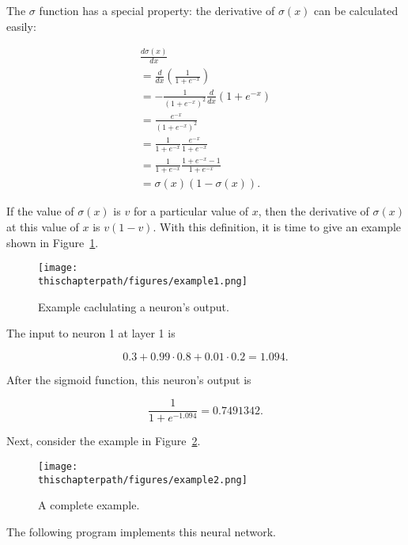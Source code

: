 The $\sigma$ function has a special property: the derivative of
$\sigma(x)$ can be calculated easily:

\begin{equation}
\begin{array}{l}
\frac{d \sigma(x)}{d x} \\
=  \frac{d}{dx} (\frac{1}{1 + e^{-x}}) \\
= - \frac{1}{(1 + e^{-x})^2} \frac{d}{dx} (1 + e^{-x}) \\
=  \frac{e^{-x}}{(1 + e^{-x})^2} \\
= \frac{1}{1 + e^{-x}} \frac{e^{-x}}{1 + e^{-x}} \\
= \frac{1}{1 + e^{-x}} \frac{1 + e^{-x} - 1}{1 + e^{-x}} \\
= \sigma(x) (1 - \sigma(x)).
\end{array}
\label{eqn:derivativesigma}
\end{equation}

If the value of $\sigma(x)$ is $v$ for a particular
value of $x$, then the derivative of $\sigma(x)$ at this value of $x$
is $v (1-v)$.
With this definition, it is time to give an example shown in
Figure~\ref{fig:example1}.  
\begin{figure}[h]
\centering
{\texttt{[image: \\thischapterpath/figures/example1.png]}}
\caption{Example caclulating a neuron's output.}
  \label{fig:example1}
\end{figure}

The input to neuron 1 at layer 1 is

\begin{equation}
0.3 + 0.99 \cdot 0.8 + 0.01 \cdot 0.2 = 1.094.
\end{equation}

After the sigmoid function, this neuron's output is

\begin{equation}
\frac{1}{1+ e^{-1.094}} = 0.7491342.
\end{equation}

Next, consider the  example in Figure~\ref{fig:example2}.

\begin{figure}[h]
\centering
{\texttt{[image: \\thischapterpath/figures/example2.png]}}
\caption{A complete example.}
  \label{fig:example2}
\end{figure}

\clearpage
The following program implements this neural network.

\resetlinenumber[1]
\linenumbers
\begin{tt}
  
\end{tt}
\nolinenumbers

